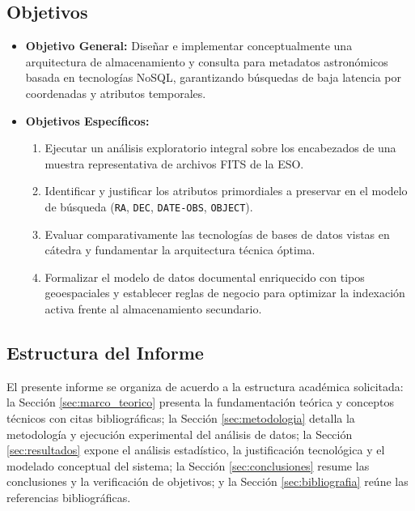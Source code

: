 \documentclass[10pt]{article}
\begin{document}
\subsection{Objetivos}
\begin{itemize}
    \item \textbf{Objetivo General:} Diseñar e implementar conceptualmente una arquitectura de almacenamiento y consulta para metadatos astronómicos basada en tecnologías NoSQL, garantizando búsquedas de baja latencia por coordenadas y atributos temporales.
    \item \textbf{Objetivos Específicos:}
    \begin{enumerate}
        \item Ejecutar un análisis exploratorio integral sobre los encabezados de una muestra representativa de archivos FITS de la ESO.
        \item Identificar y justificar los atributos primordiales a preservar en el modelo de búsqueda (\texttt{RA}, \texttt{DEC}, \texttt{DATE-OBS}, \texttt{OBJECT}).
        \item Evaluar comparativamente las tecnologías de bases de datos vistas en cátedra y fundamentar la arquitectura técnica óptima.
        \item Formalizar el modelo de datos documental enriquecido con tipos geoespaciales y establecer reglas de negocio para optimizar la indexación activa frente al almacenamiento secundario.
    \end{enumerate}
\end{itemize}

\subsection{Estructura del Informe}
El presente informe se organiza de acuerdo a la estructura académica solicitada: la Sección \ref{sec:marco_teorico} presenta la fundamentación teórica y conceptos técnicos con citas bibliográficas; la Sección \ref{sec:metodologia} detalla la metodología y ejecución experimental del análisis de datos; la Sección \ref{sec:resultados} expone el análisis estadístico, la justificación tecnológica y el modelado conceptual del sistema; la Sección \ref{sec:conclusiones} resume las conclusiones y la verificación de objetivos; y la Sección \ref{sec:bibliografia} reúne las referencias bibliográficas.

\end{document}
